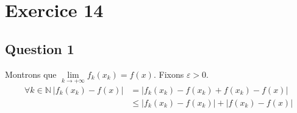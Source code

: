 \documentclass[../td5.tex]{subfiles}
\begin{document}
\section{Exercice 14}
\subsection*{Question 1}
Montrons que $\lim\limits_{k \to +\infty} f_k(x_k) = f(x)$. Fixons $\varepsilon > 0$.
\begin{align*}
  \forall k \in \mathbb{N}~|f_k(x_k)-f(x)| &= |f_k(x_k)-f(x_k)+f(x_k)-f(x)|\\
                                           &\leq |f_k(x_k)-f(x_k)|+|f(x_k)-f(x)|
\end{align*}
\end{document}
